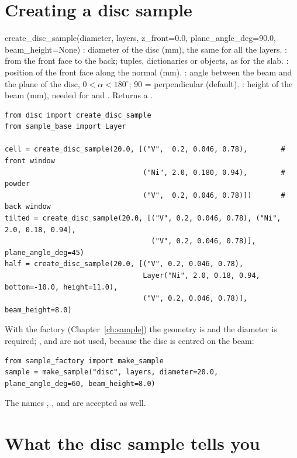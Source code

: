 \section{Creating a disc sample}

\begin{fnbox}{create\_disc\_sample(diameter, layers, z\_front=0.0, plane\_angle\_deg=90.0, beam\_height=None)}
: diameter of the disc (mm), the same for all the layers.
: from the front face to the back; tuples, dictionaries or  objects, as for the slab.
: position of the front face along the normal (mm).
: angle between the beam and the plane of the disc, $0<\alpha<180^\circ$; 90 = perpendicular (default).
: height of the beam (mm), needed for  and .
Returns a .
\end{fnbox}

\begin{lstlisting}
from disc import create_disc_sample
from sample_base import Layer

cell = create_disc_sample(20.0, [("V",  0.2, 0.046, 0.78),        # front window
                                 ("Ni", 2.0, 0.180, 0.94),        # powder
                                 ("V",  0.2, 0.046, 0.78)])       # back window
tilted = create_disc_sample(20.0, [("V", 0.2, 0.046, 0.78), ("Ni", 2.0, 0.18, 0.94),
                                   ("V", 0.2, 0.046, 0.78)], plane_angle_deg=45)
half = create_disc_sample(20.0, [("V", 0.2, 0.046, 0.78),
                                 Layer("Ni", 2.0, 0.18, 0.94, bottom=-10.0, height=11.0),
                                 ("V", 0.2, 0.046, 0.78)], beam_height=8.0)
\end{lstlisting}
With the factory (Chapter~\ref{ch:sample}) the geometry is  and the diameter is required; ,
 and  are not used, because the disc is centred on the beam:
\begin{lstlisting}
from sample_factory import make_sample
sample = make_sample("disc", layers, diameter=20.0, plane_angle_deg=60, beam_height=8.0)
\end{lstlisting}
The names , ,  and  are accepted as well.

\section{What the disc sample tells you}

